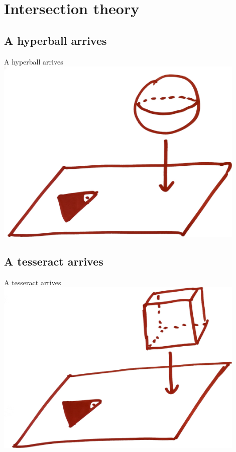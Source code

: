\documentclass[12pt,compress,ngerman,utf8,t]{beamer}
\begin{document}
\section[Intersection]{Intersection theory}

\subsection{A hyperball arrives}

\begin{frame}{A hyperball arrives}
  \centering
  \includegraphics[width=0.9\textwidth]{a-hyperball-arrives}
  \par
\end{frame}


\subsection{A tesseract arrives}

\begin{frame}{A tesseract arrives}
  \centering
  \includegraphics[width=0.9\textwidth]{a-tesseract-arrives}
  \par
\end{frame}
\end{document}
